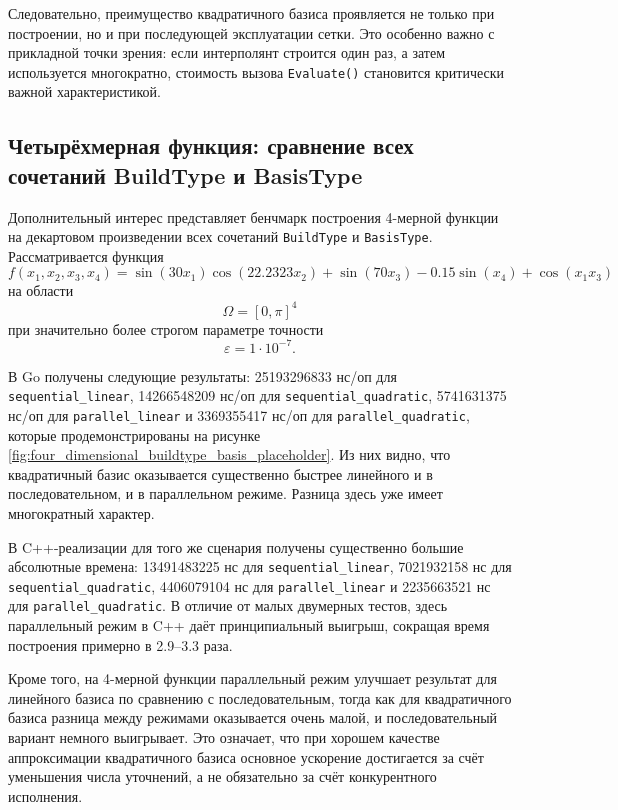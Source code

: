 Следовательно, преимущество квадратичного базиса проявляется не только при построении, но и при последующей эксплуатации сетки. Это особенно важно с прикладной точки зрения: если интерполянт строится один раз, а затем используется многократно, стоимость вызова \texttt{Evaluate()} становится критически важной характеристикой.

\subsection{Четырёхмерная функция: сравнение всех сочетаний BuildType и BasisType}

Дополнительный интерес представляет бенчмарк построения 4-мерной функции на декартовом произведении всех сочетаний \texttt{BuildType} и \texttt{BasisType}. Рассматривается функция
\begin{equation}
    f(x_1, x_2, x_3, x_4) = \sin(30x_1)\cos(22.2323x_2) + \sin(70x_3) - 0.15\sin(x_4) + \cos(x_1x_3)
\end{equation}
на области
\begin{equation}
    \Omega = [0, \pi]^4
\end{equation}
при значительно более строгом параметре точности
\begin{equation}
    \varepsilon = 1\cdot10^{-7}.
\end{equation}

В Go получены следующие результаты: 25193296833 нс/оп для \texttt{sequential\_linear}, 14266548209 нс/оп для \texttt{sequential\_quadratic}, 5741631375 нс/оп для \texttt{parallel\_linear} и 3369355417 нс/оп для \texttt{parallel\_quadratic}, которые продемонстрированы на рисунке \ref{fig:four_dimensional_buildtype_basis_placeholder}. Из них видно, что квадратичный базис оказывается существенно быстрее линейного и в последовательном, и в параллельном режиме. Разница здесь уже имеет многократный характер.

В C++-реализации для того же сценария получены существенно большие абсолютные времена: 13491483225 нс для \texttt{sequential\_linear}, 7021932158 нс для \texttt{sequential\_quadratic}, 4406079104 нс для \texttt{parallel\_linear} и 2235663521 нс для \texttt{parallel\_quadratic}. В отличие от малых двумерных тестов, здесь параллельный режим в C++ даёт принципиальный выигрыш, сокращая время построения примерно в 2.9--3.3 раза.

Кроме того, на 4-мерной функции параллельный режим улучшает результат для линейного базиса по сравнению с последовательным, тогда как для квадратичного базиса разница между режимами оказывается очень малой, и последовательный вариант немного выигрывает. Это означает, что при хорошем качестве аппроксимации квадратичного базиса основное ускорение достигается за счёт уменьшения числа уточнений, а не обязательно за счёт конкурентного исполнения.

